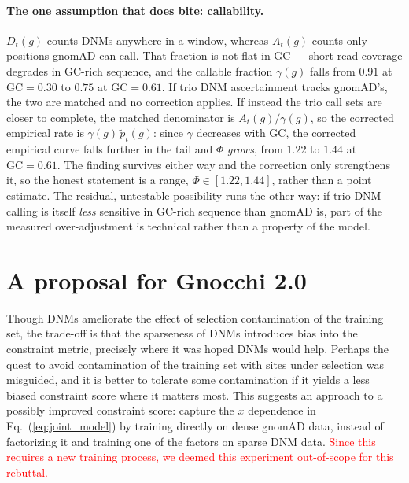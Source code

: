 \documentclass{article}
\begin{document}
\paragraph{The one assumption that does bite: callability.} $D_t(g)$ counts DNMs
anywhere in a window, whereas $A_t(g)$ counts only positions gnomAD can call. That
fraction is not flat in GC --- short-read coverage degrades in GC-rich sequence,
and the callable fraction $\gamma(g)$ falls from $0.91$ at $\mathrm{GC}=0.30$ to
$0.75$ at $\mathrm{GC}=0.61$. If trio DNM ascertainment tracks gnomAD's, the two
are matched and no correction applies. If instead the trio call sets are closer to
complete, the matched denominator is $A_t(g)/\gamma(g)$, so the corrected
empirical rate is $\gamma(g)\,\tilde{p}_t(g)$: since $\gamma$ decreases with GC,
the corrected empirical curve falls further in the tail and $\Phi$ \emph{grows},
from $1.22$ to $1.44$ at $\mathrm{GC}=0.61$. The finding survives either way and
the correction only strengthens it, so the honest statement is a range,
$\Phi \in [1.22, 1.44]$, rather than a point estimate. The residual, untestable
possibility runs the other way: if trio DNM calling is itself \emph{less}
sensitive in GC-rich sequence than gnomAD is, part of the measured
over-adjustment is technical rather than a property of the model.

\section{A proposal for Gnocchi 2.0}
Though DNMs ameliorate the effect of selection contamination of the training set, 
the trade-off is that the sparseness of DNMs introduces bias into the constraint metric, 
precisely where it was hoped DNMs would help. 
Perhaps the quest to avoid contamination of the training set with sites under selection 
was misguided,
and it is better to tolerate some contamination if it yields a less biased constraint score 
where it matters most. 
This suggests an approach to a possibly improved constraint score: 
capture the $x$ dependence in Eq.~(\ref{eq:joint_model}) by training directly on dense gnomAD data, 
instead of factorizing it and training one of the factors on sparse DNM data. 
\textcolor{red}{Since this requires a new training process, we deemed this experiment out-of-scope for this rebuttal.} 
\end{document}
